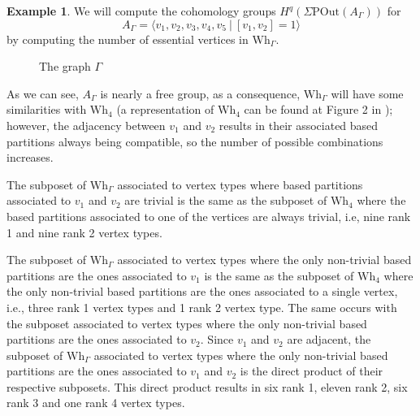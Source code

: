 \documentclass[a4paper]{amsart}
\newcommand{\G}{\Gamma}
\newcommand{\A}{{A_\Gamma}}
\newcommand{\POut}{\Sigma\mathrm{POut}}
\newcommand{\Wh}{\mathrm{Wh}}
\theoremstyle{definition}
\newtheorem{ej}[teo]{Example}
\theoremstyle{remark}
\begin{document}
\begin{ej}
    We will compute the cohomology groups $H^q(\POut(\A))$ for $$A_\G=\langle v_1, v_2, v_3, v_4, v_5\ |\ [v_1,v_2]=1\rangle$$  by computing the number of essential vertices in $\Wh_\G$.
    \begin{figure}[ht!]
    \centering
 \caption{The graph $\G$}
 \label{fig:graphsEx}
\end{figure}
    As we can see, $\A$ is nearly a free group, as a consequence, $\Wh_\G$ will have some similarities with $\Wh_4$ (a representation of $\Wh_4$ can be found at Figure 2 in \cite{MacCammondMeier}); however, the adjacency between $v_1$ and $v_2$ results in their associated based partitions always being compatible, so the number of possible combinations increases. 

    The subposet of $\Wh_\G$ associated to vertex types where   based partitions associated to $v_1$ and $v_2$ are trivial is the same as the subposet of $\Wh_4$ where the based partitions associated to one of the vertices are always trivial, i.e, nine rank 1  and nine rank 2 vertex types.

    The subposet of $\Wh_\G$ associated to vertex types where  the only non-trivial based partitions are the ones associated to $v_1$  is the same as the subposet of $\Wh_4$ where the only non-trivial based partitions are the ones associated to a single vertex, i.e., three rank 1 vertex types and 1 rank 2 vertex type. The same occurs with the subposet  associated to vertex types where  the only non-trivial based partitions are the ones associated to $v_2$. Since $v_1$ and $v_2$ are adjacent, the subposet of $\Wh_\G$ associated to vertex types where  the only non-trivial based partitions are the ones associated to $v_1$ and $v_2$ is the direct product of their respective subposets. This direct product results in six rank 1, eleven rank 2, six rank 3 and one rank 4 vertex types.


\end{ej}
\end{document}
